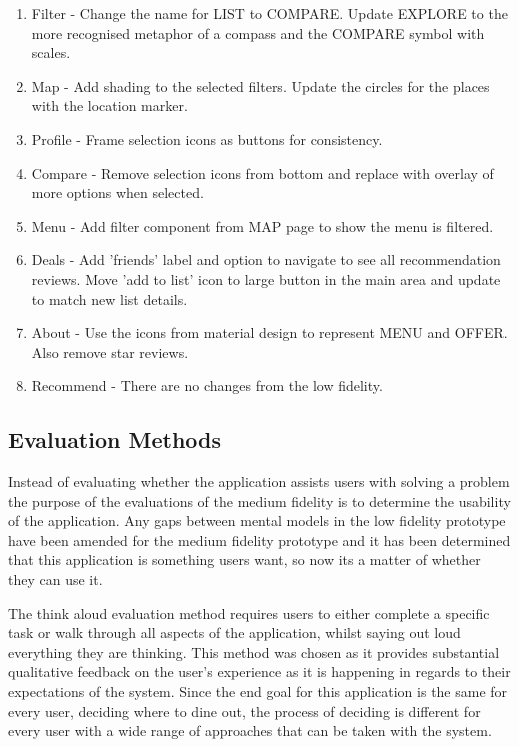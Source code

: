 \documentclass[a4 paper, 12pt]{article}
\begin{document}
\begin{enumerate}
    \item Filter - Change the name for LIST to COMPARE. Update EXPLORE to the more recognised metaphor of a compass and the COMPARE symbol with scales.
    \item Map - Add shading to the selected filters. Update the circles for the places with the location marker.
    \item Profile - Frame selection icons as buttons for consistency.
    \item Compare - Remove selection icons from bottom and replace with overlay of more options when selected. 
    \item Menu - Add filter component from MAP page to show the menu is filtered.
    \item Deals - Add 'friends' label and option to navigate to see all recommendation reviews. Move 'add to list' icon to large button in the main area and update to match new list details.
    \item About - Use the icons from material design to represent MENU and OFFER. Also remove star reviews.
    \item Recommend - There are no changes from the low fidelity.
\end{enumerate}
 

\subsection{Evaluation Methods}
Instead of evaluating whether the application assists users with solving a problem the purpose of the evaluations of the medium fidelity is to determine the usability of the application. Any gaps between mental models in the low fidelity prototype have been amended for the medium fidelity prototype and it has been determined that this application is something users want, so now its a matter of whether they can use it.  

The think aloud evaluation method requires users to either complete a specific task or walk through all aspects of the application, whilst saying out loud everything they are thinking. This method was chosen as it provides substantial qualitative feedback on the user's experience as it is happening in regards to their expectations of the system. Since the end goal for this application is the same for every user, deciding where to dine out, the process of deciding is different for every user with a wide range of approaches that can be taken with the system.
\end{document}
